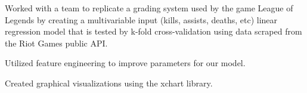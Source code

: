 \documentclass[]{deedy-resume-openfont}
\begin{document}
\begin{minipage}[t]{0.66\textwidth}
\begin{tightemize}
\item Worked with a team to replicate a grading system used by the game League of Legends by creating a multivariable input (kills, assists, deaths, etc) linear regression model that is tested by k-fold cross-validation using data scraped from the Riot Games public API.
\item Utilized feature engineering to improve parameters for our model.
\item Created graphical visualizations using the xchart library.
\end{tightemize}
\sectionsep




\end{minipage} 
\end{document}
